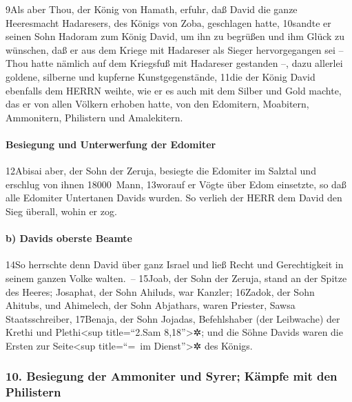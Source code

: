 9Als aber Thou, der König von Hamath, erfuhr, daß David die ganze
Heeresmacht Hadaresers, des Königs von Zoba, geschlagen hatte, 10sandte
er seinen Sohn Hadoram zum König David, um ihn zu begrüßen und ihm Glück
zu wünschen, daß er aus dem Kriege mit Hadareser als Sieger
hervorgegangen sei -- Thou hatte nämlich auf dem Kriegsfuß mit Hadareser
gestanden --, dazu allerlei goldene, silberne und kupferne
Kunstgegenstände, 11die der König David ebenfalls dem HERRN weihte, wie
er es auch mit dem Silber und Gold machte, das er von allen Völkern
erhoben hatte, von den Edomitern, Moabitern, Ammonitern, Philistern und
Amalekitern.

\hypertarget{besiegung-und-unterwerfung-der-edomiter}{%
\paragraph{Besiegung und Unterwerfung der
Edomiter}\label{besiegung-und-unterwerfung-der-edomiter}}

12Abisai aber, der Sohn der Zeruja, besiegte die Edomiter im Salztal und
erschlug von ihnen 18000~Mann, 13worauf er Vögte über Edom einsetzte, so
daß alle Edomiter Untertanen Davids wurden. So verlieh der HERR dem
David den Sieg überall, wohin er zog.

\hypertarget{b-davids-oberste-beamte}{%
\paragraph{b) Davids oberste Beamte}\label{b-davids-oberste-beamte}}

14So herrschte denn David über ganz Israel und ließ Recht und
Gerechtigkeit in seinem ganzen Volke walten.~-- 15Joab, der Sohn der
Zeruja, stand an der Spitze des Heeres; Josaphat, der Sohn Ahiluds, war
Kanzler; 16Zadok, der Sohn Ahitubs, und Ahimelech, der Sohn Abjathars,
waren Priester, Sawsa Staatsschreiber, 17Benaja, der Sohn Jojadas,
Befehlshaber (der Leibwache) der Krethi und Plethi\textless sup
title=``2.Sam 8,18''\textgreater✲; und die Söhne Davids waren die Ersten
zur Seite\textless sup title=``=~im Dienst''\textgreater✲ des Königs.

\hypertarget{besiegung-der-ammoniter-und-syrer-kuxe4mpfe-mit-den-philistern}{%
\subsubsection{10. Besiegung der Ammoniter und Syrer; Kämpfe mit den
Philistern}\label{besiegung-der-ammoniter-und-syrer-kuxe4mpfe-mit-den-philistern}}

